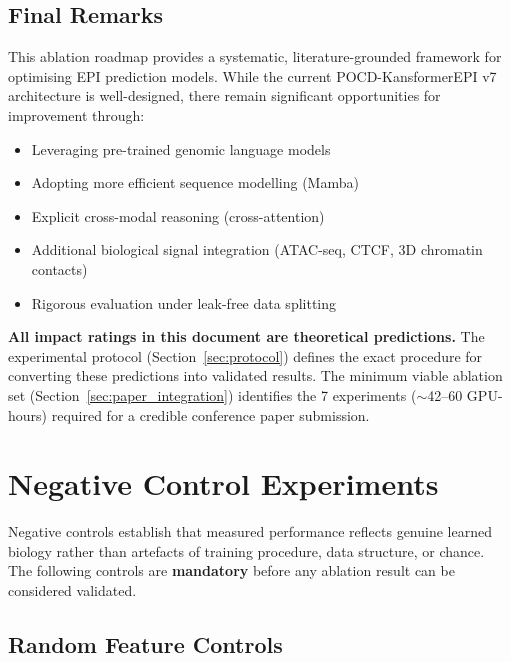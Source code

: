 \documentclass[11pt,a4paper]{article}
\begin{document}
\subsection{Final Remarks}

This ablation roadmap provides a systematic, literature-grounded framework for optimising EPI prediction models. While the current POCD-KansformerEPI v7 architecture is well-designed, there remain significant opportunities for improvement through:

\begin{itemize}
    \item Leveraging pre-trained genomic language models
    \item Adopting more efficient sequence modelling (Mamba)
    \item Explicit cross-modal reasoning (cross-attention)
    \item Additional biological signal integration (ATAC-seq, CTCF, 3D chromatin contacts)
    \item Rigorous evaluation under leak-free data splitting
\end{itemize}

\textbf{All impact ratings in this document are theoretical predictions.} The experimental protocol (Section~\ref{sec:protocol}) defines the exact procedure for converting these predictions into validated results. The minimum viable ablation set (Section~\ref{sec:paper_integration}) identifies the 7 experiments ($\sim$42--60 GPU-hours) required for a credible conference paper submission.

\section{Negative Control Experiments}
\label{sec:negative_controls}

Negative controls establish that measured performance reflects genuine learned biology rather than artefacts of training procedure, data structure, or chance. The following controls are \textbf{mandatory} before any ablation result can be considered validated.

\subsection{Random Feature Controls}
\end{document}
